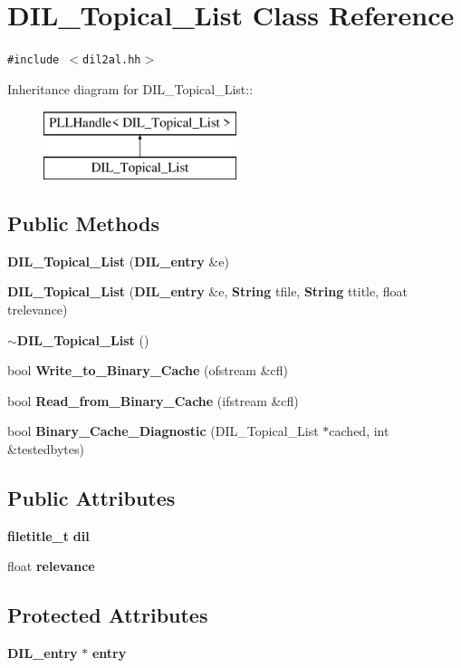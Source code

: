 \section{DIL\_\-Topical\_\-List  Class Reference}
\label{classDIL__Topical__List}
{\tt \#include $<$dil2al.hh$>$}

Inheritance diagram for DIL\_\-Topical\_\-List::\begin{figure}[H]
\begin{center}
\leavevmode
\includegraphics[height=2cm]{classDIL__Topical__List}
\end{center}
\end{figure}
\subsection*{Public Methods}
\begin{CompactItemize}
\item 
{\bf DIL\_\-Topical\_\-List} ({\bf DIL\_\-entry} \&e)
\item 
{\bf DIL\_\-Topical\_\-List} ({\bf DIL\_\-entry} \&e, {\bf String} tfile, {\bf String} ttitle, float trelevance)
\item 
{\bf $\sim$DIL\_\-Topical\_\-List} ()
\item 
bool {\bf Write\_\-to\_\-Binary\_\-Cache} (ofstream \&cfl)
\item 
bool {\bf Read\_\-from\_\-Binary\_\-Cache} (ifstream \&cfl)
\item 
bool {\bf Binary\_\-Cache\_\-Diagnostic} (DIL\_\-Topical\_\-List $\ast$cached, int \&testedbytes)
\end{CompactItemize}
\subsection*{Public Attributes}
\begin{CompactItemize}
\item 
{\bf filetitle\_\-t} {\bf dil}
\item 
float {\bf relevance}
\end{CompactItemize}
\subsection*{Protected Attributes}
\begin{CompactItemize}
\item 
{\bf DIL\_\-entry} $\ast$ {\bf entry}
\end{CompactItemize}


